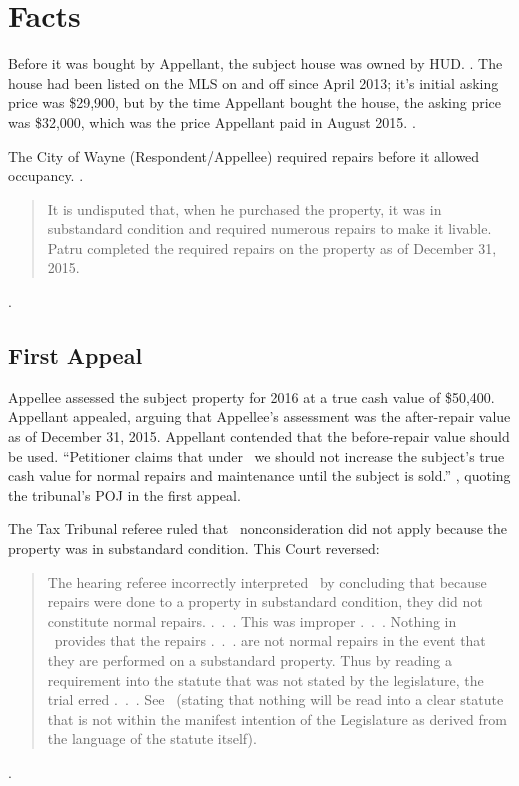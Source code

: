 \documentclass[12pt,\documentclassflag]{michiganCourtOfAppealsBrief}
\begin{document}
\section{Facts}
\label{facts}

Before it was bought by Appellant, the subject house was owned by HUD.
\mlsListing[]. 
The house had been listed on the MLS on and off since April 2013;
it's initial asking price was \$29,900,
but by the time Appellant bought the house, the asking price was \$32,000,
which was the price Appellant paid in August 2015. \mlsHistory[].

The City of Wayne (Respondent/Appellee) required repairs before it allowed occupancy. %
\repairs.

\begin{quote}
  It is undisputed that, when he purchased the property, it was in substandard condition and required numerous repairs to make it livable. Patru completed the required repairs on the property as of December 31, 2015.
\end{quote}
.

\subsection{First Appeal}

Appellee assessed the subject property for 2016 at a true cash value of \$50,400. Appellant appealed, arguing that Appellee's assessment was the after-repair value as of December 31, 2015.
Appellant contended that the before-repair value should be used. 
``Petitioner claims that under \mathieuGast\ we should not increase the subject's true cash value for normal repairs and maintenance until the subject is sold.'' , quoting the tribunal's POJ in the first appeal.

The Tax Tribunal referee ruled that \mathieuGast\ nonconsideration did not apply because the property was in substandard condition.
This Court reversed:

\begin{quote}
  The hearing referee incorrectly interpreted \mathieuGast\ by concluding that because repairs were done to a property in substandard condition, they did not constitute normal repairs. .~.~. This was improper .~.~. Nothing in \mathieuGast\ provides that the repairs .~.~. are not normal repairs in the event that they are performed on a substandard property. Thus by reading a requirement into the statute that was not stated by the legislature, the trial erred .~.~. See \ (stating that nothing will be read into a clear statute that is not within the manifest intention of the Legislature as derived from the language of the statute itself).
\end{quote}
.
\end{document}
